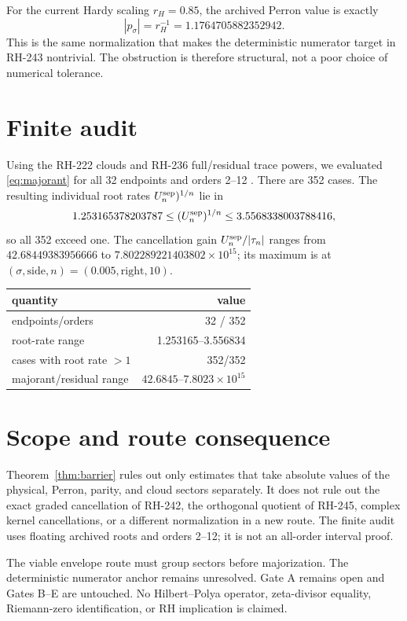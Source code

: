 \documentclass[11pt]{article}
\begin{document}
For the current Hardy scaling $r_H=0.85$, the archived Perron value is exactly
\[
 |p_\sigma|=r_H^{-1}=1.1764705882352942.
\]
This is the same normalization that makes the deterministic numerator target
in RH-243 nontrivial.  The obstruction is therefore structural, not a poor
choice of numerical tolerance.

\section{Finite audit}

Using the RH-222 clouds and RH-236 full/residual trace powers, we evaluated
\eqref{eq:majorant} for all 32 endpoints and orders 2--12
\citep{WangRH236}.  There are 352 cases.  The resulting individual root rates
\(U_n^{\rm sep})^{1/n}\) lie in
\[
 1.253165378203787\le (U_n^{\rm sep})^{1/n}
 \le3.5568338003788416,
\]
so all 352 exceed one.  The cancellation gain
$U_n^{\rm sep}/|\tau_n|$ ranges from
\(42.68449383956666\) to \(7.802289221403802\times10^{15}\); its maximum is
at $(\sigma,\mathrm{side},n)=(0.005,\mathrm{right},10)$.

\begin{center}
\small
\begin{tabular}{lr}
\toprule
quantity & value\\
\midrule
endpoints/orders & 32 / 352\\
root-rate range & 1.253165--3.556834\\
cases with root rate $>1$ & 352/352\\
majorant/residual range & $42.6845$--$7.8023\times10^{15}$\\
\bottomrule
\end{tabular}
\end{center}

\section{Scope and route consequence}

Theorem~\ref{thm:barrier} rules out only estimates that take absolute values
of the physical, Perron, parity, and cloud sectors separately.  It does not
rule out the exact graded cancellation of RH-242, the orthogonal quotient of
RH-245, complex kernel cancellations, or a different normalization in a new
route.  The finite audit uses floating archived roots and orders 2--12; it is
not an all-order interval proof.

The viable envelope route must group sectors before majorization.  The
deterministic numerator anchor remains unresolved.  Gate A remains open and
Gates B--E are untouched.  No Hilbert--Polya operator, zeta-divisor equality,
Riemann-zero identification, or RH implication is claimed.



\end{document}
